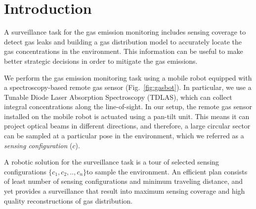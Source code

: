 \section{Introduction}
\label{sec:intro}


A surveillance task for the gas emission monitoring includes sensing coverage to detect gas leaks and building a gas distribution model to accurately locate the gas concentrations in the environment. This information can be useful to make better strategic decisions in order to mitigate the gas emissions.



We perform the gas emission monitoring task using a mobile robot equipped with a spectroscopy-based remote gas sensor (Fig.~\ref{fig:gasbot}). 
In particular, we use a Tunable Diode Laser Absorption Spectroscopy (TDLAS), which can collect integral concentrations along the line-of-sight.
In our setup, the remote gas sensor installed on the mobile robot is actuated using a pan-tilt unit.
This means it can project optical beams in different directions, and therefore, a large circular sector can be sampled at a particular pose in the environment, which we referred as a \textit{sensing configuration} ($c$). 





A robotic solution for the surveillance task is a tour of selected sensing configurations $\{c_1,c_2,..,c_n\}$to sample the environment. An efficient plan consists of least number of sensing configurations and minimum traveling distance, and yet provides a surveillance that result into maximum sensing coverage and high quality reconstructions of gas distribution. %


